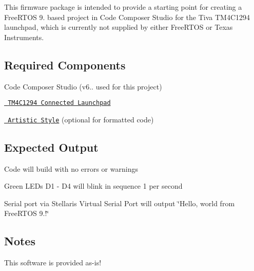 This firmware package is intended to provide a starting point for creating a Free\+R\+T\+OS 9. based project in Code Composer Studio for the Tiva T\+M4\+C1294 launchpad, which is currently not supplied by either Free\+R\+T\+OS or Texas Instruments.

\subsection*{Required Components}


\begin{DoxyItemize}
\item Code Composer Studio (v6.. used for this project)
\item \href{http://www.ti.com/tool/ek-tm4c1294xl}{\texttt{ T\+M4\+C1294 Connected Launchpad}}
\item \href{http://astyle.sourceforge.net/astyle.html}{\texttt{ Artistic Style}} (optional for formatted code)
\end{DoxyItemize}

\subsection*{Expected Output}


\begin{DoxyItemize}
\item Code will build with no errors or warnings
\item Green L\+E\+Ds D1 -\/ D4 will blink in sequence 1 per second
\item Serial port via Stellaris Virtual Serial Port will output \char`\"{}\+Hello, world from Free\+R\+T\+O\+S 9.!\char`\"{}
\end{DoxyItemize}

\subsection*{Notes}

This software is provided as-\/is! 